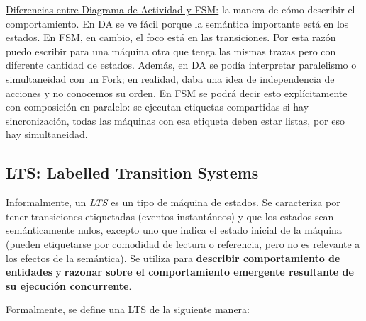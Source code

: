 \documentclass[]{article}
\begin{document}
\underline{Diferencias entre Diagrama de Actividad y FSM:} la manera de cómo describir el comportamiento. En DA se ve fácil porque la semántica importante está en los estados. En FSM, en cambio, el foco está en las transiciones. Por esta razón puedo escribir para una máquina otra que tenga las mismas trazas pero con diferente cantidad de estados. Además, en DA se podía interpretar paralelismo o simultaneidad con un Fork; en realidad, daba una idea de independencia de acciones y no conocemos su orden. En FSM se podrá decir esto explícitamente con composición en paralelo: se ejecutan etiquetas compartidas si hay sincronización, todas las máquinas con esa etiqueta deben estar listas, por eso hay simultaneidad.

\subsection{LTS: Labelled Transition Systems}
Informalmente, un \textit{LTS} es un tipo de máquina de estados. Se caracteriza por tener transiciones etiquetadas (eventos instantáneos) y que los estados sean semánticamente nulos, excepto uno que indica el estado inicial de la máquina (pueden etiquetarse por comodidad de lectura o referencia, pero no es relevante a los efectos de la semántica). Se utiliza para \textbf{describir comportamiento de entidades} y \textbf{razonar sobre el comportamiento emergente resultante de su ejecución concurrente}.

Formalmente, se define una LTS de la siguiente manera:

\end{document}
